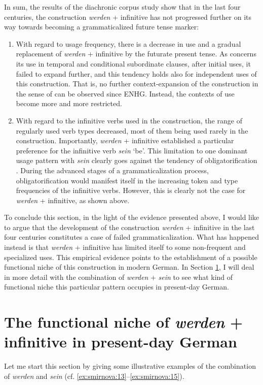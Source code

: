 \documentclass[output=paper,colorlinks,citecolor=brown]{langscibook}
\begin{document}
\par In sum, the results of the diachronic corpus study show that in the last four centuries, the construction \emph{werden} + infinitive has not progressed further on its way towards becoming a grammaticalized future tense marker: 
\begin{enumerate}
    \item With regard to usage frequency, there is a decrease in use and a gradual replacement of \emph{werden} + infinitive by the futurate present tense. As concerns its use in temporal and conditional subordinate clauses, after initial uses, it failed to expand further, and this tendency holds also for independent uses of this construction. That is, no further context-expansion of the construction in the sense of \citet{Himmelmann2004} can be observed since ENHG. Instead, the contexts of use become more and more restricted. 
    \item With regard to the infinitive verbs used in the construction, the range of regularly used verb types decreased, most of them being used rarely in the construction. Importantly, \emph{werden} + infinitive established a particular preference for the infinitive verb \emph{sein} `be'. This limitation to one dominant usage pattern with \emph{sein} clearly goes against the tendency of obligatorification \citep{Lehmann1995}. During the advanced stages of a grammaticalization process, obligatorification would manifest itself in the increasing token and type frequencies of the infinitive verbs. However, this is clearly not the case for \emph{werden} + infinitive, as shown above.
\end{enumerate} 
To conclude this section, in the light of the evidence presented above, I would like to argue that the development of the construction \emph{werden} + infinitive in the last four centuries constitutes a case of failed grammaticalization. What has happened instead is that \emph{werden} + infinitive has limited itself to some non-frequent and specialized uses. This empirical evidence points to the establishment of a possible functional niche of this construction in modern German. In Section \ref{sec:smirnova:4}, I will deal in more detail with the combination of \emph{werden} + \emph{sein} to see what kind of functional niche this particular pattern occupies in present-day German.

\largerpage[1]

\section{The functional niche of \emph{werden} + infinitive in present-day German} \label{sec:smirnova:4}
Let me start this section by giving some illustrative examples of the combination of \emph{werden} and \emph{sein} (cf. \ref{ex:smirnova:13}--\ref{ex:smirnova:15}).
\end{document}
